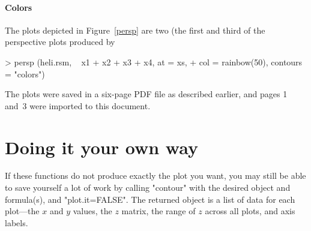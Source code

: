 \documentclass[article,nojss]{jss}
\begin{document}
\paragraph{Colors}
The plots depicted in Figure~\ref{persp} are two (the first and third of the perspective plots produced by
\begin{Schunk}
\begin{Sinput}
> persp (heli.rsm, ~ x1 + x2 + x3 + x4, at = xs, 
+   col = rainbow(50), contours = "colors")
\end{Sinput}
\end{Schunk}
The plots were saved in a six-page PDF file as described earlier, and pages 1 and~3 were imported to this document.

\section{Doing it your own way}
If these functions do not produce exactly the plot you want, you may still be able to save yourself a lot of work by calling "contour" with the desired object and formula(s), and "plot.it=FALSE".  The returned object is a list of data for each plot---the $x$ and $y$ values, the $z$ matrix, the range of $z$ across all plots, and axis labels.


\end{document}
